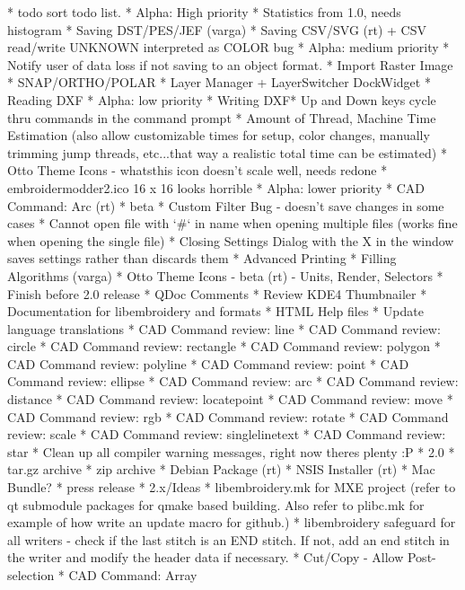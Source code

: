 \documentclass[11pt]{report}
\begin{document}
* todo sort todo list.
* Alpha: High priority
    * Statistics from 1.0, needs histogram
    * Saving DST/PES/JEF (varga)
    * Saving CSV/SVG (rt) + CSV read/write UNKNOWN interpreted as COLOR bug
* Alpha: medium priority
    * Notify user of data loss if not saving to an object format.
    * Import Raster Image
    * SNAP/ORTHO/POLAR
    * Layer Manager + LayerSwitcher DockWidget
    * Reading DXF
* Alpha: low priority
    * Writing DXF* Up and Down keys cycle thru commands in the command prompt
    * Amount of Thread, Machine Time Estimation (also allow customizable times for setup, color changes, manually trimming jump threads, etc...that way a realistic total time can be estimated)
    * Otto Theme Icons - whatsthis icon doesn't scale well, needs redone
    * embroidermodder2.ico 16 x 16 looks horrible
* Alpha: lower priority
    * CAD Command: Arc (rt)
* beta
    * Custom Filter Bug - doesn't save changes in some cases
    * Cannot open file with `\#` in name when opening multiple files (works fine when opening the single file)
    * Closing Settings Dialog with the X in the window saves settings rather than discards them
    * Advanced Printing
    * Filling Algorithms (varga)
    * Otto Theme Icons - beta (rt) - Units, Render, Selectors
* Finish before 2.0 release
    * QDoc Comments
    * Review KDE4 Thumbnailer
    * Documentation for libembroidery and formats
    * HTML Help files
    * Update language translations
    * CAD Command review: line
    * CAD Command review: circle
    * CAD Command review: rectangle
    * CAD Command review: polygon
    * CAD Command review: polyline
    * CAD Command review: point
    * CAD Command review: ellipse
    * CAD Command review: arc
    * CAD Command review: distance
    * CAD Command review: locatepoint
    * CAD Command review: move
    * CAD Command review: rgb
    * CAD Command review: rotate
    * CAD Command review: scale
    * CAD Command review: singlelinetext
    * CAD Command review: star
    * Clean up all compiler warning messages, right now theres plenty :P
* 2.0
    * tar.gz archive
    * zip archive
    * Debian Package (rt)
    * NSIS Installer (rt)
    * Mac Bundle?
    * press release
* 2.x/Ideas
    * libembroidery.mk for MXE project (refer to qt submodule packages for qmake based building. Also refer to plibc.mk for example of how write an update macro for github.)
    * libembroidery safeguard for all writers - check if the last stitch is an END stitch. If not, add an end stitch in the writer and modify the header data if necessary.
    * Cut/Copy - Allow Post-selection
    * CAD Command: Array
\end{document}
